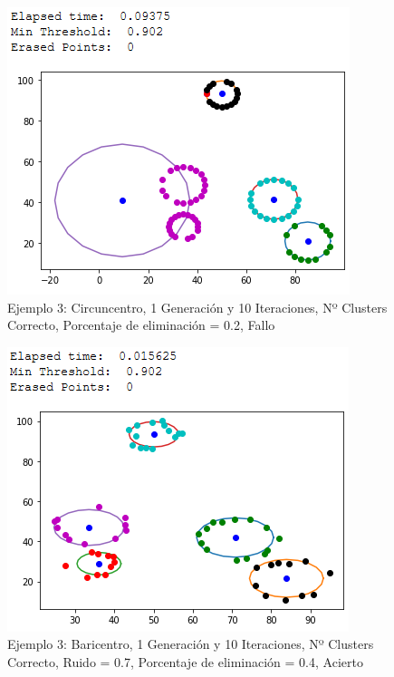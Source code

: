 \documentclass[conference,a4paper]{IEEEtran}
\begin{document}
\begin{figure}[H]
\centering
\includegraphics[scale=0.65]{Experimentacion/Ejemplo3/ej3_c_1_10_le_wrong}
\caption{Ejemplo 3: Circuncentro, 1 Generación y 10 Iteraciones,  Nº Clusters Correcto, Porcentaje de eliminación = 0.2, Fallo\\}
\end{figure}

\begin{figure}[H]
\centering
\includegraphics[scale=0.65]{Experimentacion/Ejemplo3/ej3_b_1_10_re_correct}
\caption{Ejemplo 3: Baricentro, 1 Generación y 10 Iteraciones,  Nº Clusters Correcto, Ruido = 0.7, Porcentaje de eliminación = 0.4, Acierto\\}
\end{figure}
\end{document}
